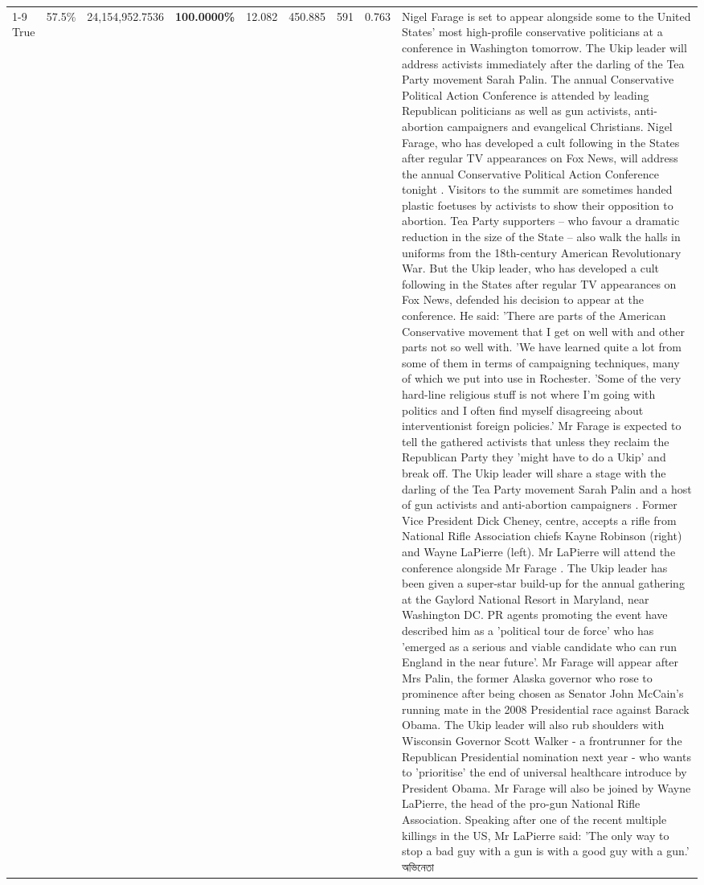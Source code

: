 \begin{table}[H]
\begin{tabular}{lllrlllll}
\cline{1-9}
True & 57.5\% & 24,154,952.7536 & \bfseries \color{red} 100.0000\% & 12.082 & 450.885 & 591 & 0.763 & Nigel Farage is set to appear alongside some to the United States' most high-profile conservative politicians at a conference in Washington tomorrow. The Ukip leader will address activists immediately after the darling of the Tea Party movement Sarah Palin. The annual Conservative Political Action Conference is attended by leading Republican politicians as well as gun activists, anti-abortion campaigners and evangelical Christians. Nigel Farage, who has developed a cult following in the States after regular TV appearances on Fox News, will address the annual Conservative Political Action Conference tonight . Visitors to the summit are sometimes handed plastic foetuses by activists to show their opposition to abortion. Tea Party supporters – who favour a dramatic reduction in the size of the State – also walk the halls in uniforms from the 18th-century American Revolutionary War. But the Ukip leader, who has developed a cult following in the States after regular TV appearances on Fox News, defended his decision to appear at the conference. He said: 'There are parts of the American Conservative movement that I get on well with and other parts not so well with. 'We have learned quite a lot from some of them in terms of campaigning techniques, many of which we put into use in Rochester. 'Some of the very hard-line religious stuff is not where I'm going with politics and I often find myself disagreeing about interventionist foreign policies.' Mr Farage is expected to tell the gathered activists that unless they reclaim the Republican Party they 'might have to do a Ukip' and break off. The Ukip leader will share a stage with the darling of the Tea Party movement Sarah Palin and a host of gun activists and anti-abortion campaigners . Former Vice President Dick Cheney, centre, accepts a rifle from National Rifle Association chiefs Kayne Robinson (right) and Wayne LaPierre (left). Mr LaPierre will attend the conference alongside Mr Farage . The Ukip leader has been given a super-star build-up for the annual gathering at the Gaylord National Resort in Maryland, near Washington DC. PR agents promoting the event have described him as a 'political tour de force' who has 'emerged as a serious and viable candidate who can run England in the near future'. Mr Farage will appear after Mrs Palin, the former Alaska governor who rose to prominence after being chosen as Senator John McCain's running mate in the 2008 Presidential race against Barack Obama. The Ukip leader will also rub shoulders with Wisconsin Governor Scott Walker - a frontrunner for the Republican Presidential nomination next year - who wants to 'prioritise' the end of universal healthcare introduce by President Obama. Mr Farage will also be joined by Wayne LaPierre, the head of the pro-gun National Rifle Association. Speaking after one of the recent multiple killings in the US, Mr LaPierre said: 'The only way to stop a bad guy with a gun is with a good guy with a gun.' অভিনেতা \\

\end{tabular}
\end{table}
